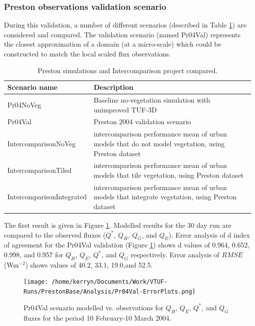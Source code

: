\documentclass[final,3p,times,authoryear]{elsarticle}
\begin{document}
\subsubsection{Preston observations validation scenario}\label{sec:prvalresults}

During this validation, a number of different scenarios (described in Table \ref{tab:simscompared}) are considered and compared. The validation scenario (named Pr04Val) represents the closest approximation of a domain (at a micro-scale) which could be constructed to match the local scaled flux observations. 

\begin{center}
\begin{table}[!htbp]
\caption{Preston simulations and Intercomparison project compared.\label{tab:simscompared}} 
\begin{tabular}{  | p{0.30\linewidth} | p{0.70\linewidth} |  } 
\hline \textbf{Scenario name} & \textbf{Description}  \\ \hline
Pr04NoVeg & Baseline no-vegetation simulation with unimproved TUF-3D    \\ \hline
Pr04Val & Preston 2004 validation scenario  \\ \hline	
IntercomparisonNoVeg & \cite{Best2012} intercomparison performance mean of urban models that do not model vegetation, using \cite{Coutts2007} Preston dataset  \\ \hline
IntercomparisonTiled & \cite{Best2012} intercomparison performance mean of urban models that tile vegetation, using \cite{Coutts2007} Preston dataset  \\ \hline
IntercomparisonIntegrated & \cite{Best2012} intercomparison performance mean of urban models that integrate vegetation, using \cite{Coutts2007} Preston dataset  \\ \hline
  \end{tabular} 
\end{table}
\end{center}  

The first result is given in Figure \ref{fig:Preston6error}. Modelled results for the 30 day run are compared to the observed fluxes ($Q^{*}$, $Q_{H}$, $Q_{G}$, and $Q_{E}$). Error analysis of d index of agreement for the Pr04Val validation (Figure \ref{fig:Preston6error}) shows d values of 0.964, 0.652, 0.998, and 0.957 for $Q_{H}$, $Q_{E}$, $Q^{*}$, and $Q_{G}$ respectively. Error analysis of $RMSE$ (Wm$^{-2}$) shows values of 40.2, 33.1, 19.0,and 52.5. 

\begin{figure}[!htbp]
\texttt{[image: /home/kerryn/Documents/Work/VTUF-Runs/PrestonBase/Analysis/Pr04Val-ErrorPlots.png]}
\caption{Pr04Val scenario modelled vs. observations for $Q_{H}$, $Q_{E}$, $Q^{*}$, and $Q_{G}$ fluxes for the period 10 February-10 March 2004. \label{fig:Preston6error}}   
\end{figure}
\end{document}
